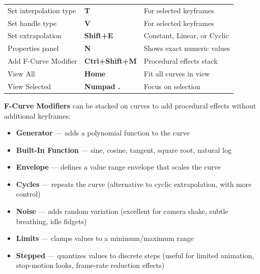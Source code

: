 \begin{shortcutbox}
\begin{center}
\begin{tabularx}{\textwidth}{L{5cm}C{3.5cm}X}
\toprule
{}
 &  &  \\
\midrule
Set interpolation type & \textbf{T} & For selected keyframes \\
Set handle type & \textbf{V} & For selected keyframes \\
Set extrapolation & \textbf{Shift+E} & Constant, Linear, or Cyclic \\
Properties panel & \textbf{N} & Shows exact numeric values \\
Add F-Curve Modifier & \textbf{Ctrl+Shift+M} & Procedural effects stack \\
View All & \textbf{Home} & Fit all curves in view \\
View Selected & \textbf{Numpad .} & Focus on selection \\
\bottomrule
\end{tabularx}
\end{center}
\end{shortcutbox}

\textbf{F-Curve Modifiers} can be stacked on curves to add procedural effects without additional keyframes:

\begin{itemize}[leftmargin=2em]
  \item \textbf{Generator} --- adds a polynomial function to the curve
  \item \textbf{Built-In Function} --- sine, cosine, tangent, square root, natural log
  \item \textbf{Envelope} --- defines a value range envelope that scales the curve
  \item \textbf{Cycles} --- repeats the curve (alternative to cyclic extrapolation, with more control)
  \item \textbf{Noise} --- adds random variation (excellent for camera shake, subtle breathing, idle fidgets)
  \item \textbf{Limits} --- clamps values to a minimum/maximum range
  \item \textbf{Stepped} --- quantizes values to discrete steps (useful for limited animation, stop-motion looks, frame-rate reduction effects)
\end{itemize}


